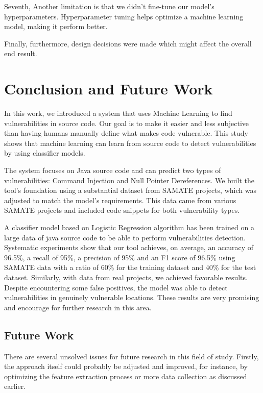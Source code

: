 \documentclass[journal,a4paper]{IEEEtran}
\begin{document}
Seventh, Another limitation is that we didn't fine-tune our model's hyperparameters. Hyperparameter tuning helps optimize a machine learning model, making it perform better.

Finally, furthermore, design decisions were made which might affect the overall end result.

\section{Conclusion and Future Work}

In this work, we introduced a system that uses Machine Learning to find vulnerabilities in source code. Our goal is to make it easier and less subjective than having humans manually define what makes code vulnerable. This study shows that machine learning can learn from source code to detect vulnerabilities by using classifier models.

The system focuses on Java source code and can predict two types of vulnerabilities: Command Injection and Null Pointer Dereferences. We built the tool's foundation using a substantial dataset from SAMATE projects, which was adjusted to match the model's requirements. This data came from various SAMATE projects and included code snippets for both vulnerability types.

A classifier model based on Logistic Regression algorithm has been trained on a large data of java source code to be able to perform vulnerabilities detection. Systematic experiments show that our tool achieves, on average, an accuracy of 96.5\%, a recall of 95\%, a precision of 95\% and an F1 score of 96.5\% using SAMATE data with a ratio of 60\% for the training dataset and 40\% for the test dataset. Similarly, with data from real projects, we achieved favorable results. Despite encountering some false positives, the model was able to detect vulnerabilities in genuinely vulnerable locations. These results are very promising and encourage for further research in this area.

\subsection{Future Work}

There are several unsolved issues for future research in this field of study. Firstly, the approach itself could probably be adjusted and improved, for instance, by optimizing the feature extraction process or more data collection as discussed earlier.
\end{document}
